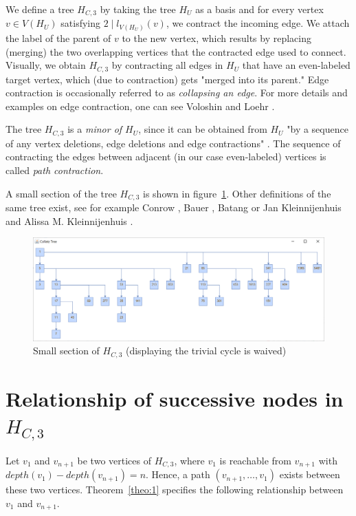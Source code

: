 We define a tree $H_{C,3}$ by taking the tree $H_U$ as a basis and for every vertex $v\in V(H_U)$ satisfying $2\mid l_{V(H_U)}(v)$, we contract the incoming edge. We attach the label of the parent of $v$ to the new vertex, which results by replacing (merging) the two overlapping vertices that the contracted edge used to connect. Visually, we obtain $H_{C,3}$ by contracting all edges in $H_U$ that have an even-labeled target vertex, which (due to contraction) gets "merged into its parent." Edge contraction is occasionally referred to as \textit{collapsing an edge}. For more details and examples on edge contraction, one can see Voloshin \cite[p.~27]{Ref_Voloshin} and Loehr \cite{Ref_Loehr}.

The tree $H_{C,3}$ is a \textit{minor of $H_U$}, since it can be obtained from $H_U$ "by a sequence of any vertex deletions, edge deletions and edge contractions" \cite[p.~32]{Ref_Voloshin}. The sequence of contracting the edges between adjacent (in our case even-labeled) vertices is called \textit{path contraction}.

A small section of the tree $H_{C,3}$ is shown in figure~\ref{fig:2}. Other definitions of the same tree exist, see for example Conrow \cite{Ref_Conrow}, Bauer \cite[p.~379]{Ref_Bauer}, Batang \cite{Ref_Batang} or Jan Kleinnijenhuis and Alissa M. Kleinnijenhuis \cite{Ref_Kleinnijenhuis}.

\begin{figure}
	\includegraphics[width=1.00\textwidth]{figures/h_c3.png}
	\caption{Small section of $H_{C,3}$ (displaying the trivial cycle is waived)}
	\label{fig:2}
\end{figure}

\section{\texorpdfstring{Relationship of successive nodes in $H_{C,3}$}{Relationship of successive nodes in HC3}}

Let $v_1$ and $v_{n+1}$ be two vertices of $H_{C,3}$, where $v_1$ is reachable from $v_{n+1}$ with $depth(v_1)-depth(v_{n+1})=n$. Hence, a path $(v_{n+1},\ldots,v_1)$ exists between these two vertices. Theorem~\ref{theo:1} specifies the following relationship between $v_1$ and $v_{n+1}$.

